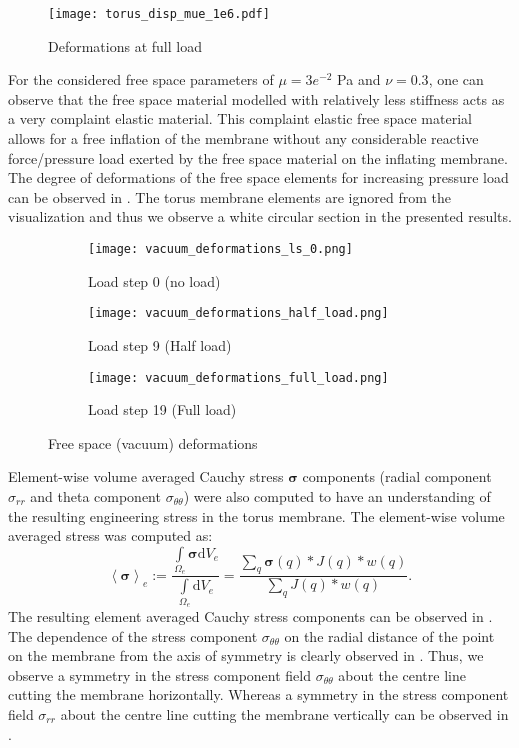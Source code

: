 \begin{figure}[h!]
\centering
\texttt{[image: torus\_disp\_mue\_1e6.pdf]}
\caption{Deformations at full load}
\label{fig:2.9}
\end{figure}

For the considered free space parameters of $\mu = 3e^{-2}$ Pa and $\nu = 0.3$, one can observe that the free space material modelled with relatively less stiffness acts as a very complaint elastic material. This complaint elastic free space material allows for a free inflation of the membrane without any considerable reactive force/pressure load exerted by the free space material on the inflating membrane. The degree of deformations of the free space elements for increasing pressure load can be observed in . The torus membrane elements are ignored from the visualization and thus we observe a white circular section in the presented results.\par 

\begin{figure}[h!]
\centering 
\begin{subfigure}[b]{0.32\textwidth}
\centering
\texttt{[image: vacuum\_deformations\_ls\_0.png]}
\caption{Load step 0 (no load)}
\label{fig:2.10.1}
\end{subfigure}
\begin{subfigure}[b]{0.32\textwidth}
\centering
\texttt{[image: vacuum\_deformations\_half\_load.png]}
\caption{Load step 9 (Half load)}
\label{fig:2.10.2}
\end{subfigure}
\begin{subfigure}[b]{0.32\textwidth}
\centering
\texttt{[image: vacuum\_deformations\_full\_load.png]}
\caption{Load step 19 (Full load)}
\label{fig:2.10.3}
\end{subfigure}
\caption{Free space (vacuum) deformations}
\label{fig:2.10}
\end{figure}

Element-wise volume averaged Cauchy stress $\bm{\sigma}$ components (radial component $\sigma_{rr}$ and theta component $\sigma_{\theta \theta}$) were also computed to have an understanding of the resulting engineering stress in the torus membrane. The element-wise volume averaged stress was computed as:
\begin{equation}
\left\langle \bm{\sigma} \right\rangle_e := \dfrac{\int\limits_{\Omega_{e}} \bm{\sigma} \mathrm{d}V_e}{\int\limits_{\Omega_{e}} \mathrm{d}V_e} = \dfrac{\sum\limits_{q} \bm{\sigma}(q) * J(q) * w(q)}{\sum\limits_{q} J(q) * w(q)}.
\end{equation}  
The resulting element averaged Cauchy stress components can be observed in . The dependence of the stress component $\sigma_{\theta \theta}$ on the radial distance of the point on the membrane from the axis of symmetry is clearly observed in . Thus, we observe a symmetry in the stress component field $\sigma_{\theta \theta}$ about the centre line cutting the membrane horizontally. Whereas a symmetry in the stress component field $\sigma_{rr}$ about the centre line cutting the membrane vertically can be observed in . \par 
 

